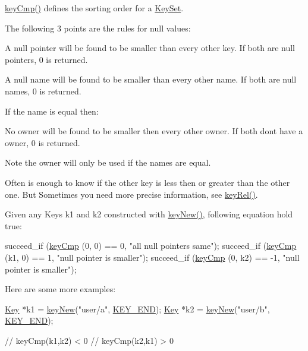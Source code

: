 \hyperlink{group__keytest_gaf6e66e12fe04d535a5d1c8218ced803e}{key\+Cmp()} defines the sorting order for a \hyperlink{classkdb_1_1KeySet}{Key\+Set}.

The following 3 points are the rules for null values\+:


\begin{DoxyItemize}
\item A null pointer will be found to be smaller than every other key. If both are null pointers, 0 is returned.
\item A null name will be found to be smaller than every other name. If both are null names, 0 is returned.
\end{DoxyItemize}

If the name is equal then\+:


\begin{DoxyItemize}
\item No owner will be found to be smaller then every other owner. If both don\textquotesingle{}t have a owner, 0 is returned.
\end{DoxyItemize}

\begin{DoxyNote}{Note}
the owner will only be used if the names are equal.
\end{DoxyNote}
Often is enough to know if the other key is less then or greater than the other one. But Sometimes you need more precise information, see \hyperlink{group__keytest_ga6bb0f95ac34ce9c42d61bb35a76139d0}{key\+Rel()}.

Given any Keys k1 and k2 constructed with \hyperlink{group__key_gad23c65b44bf48d773759e1f9a4d43b89}{key\+New()}, following equation hold true\+:


\begin{DoxyCodeInclude}
        succeed\_if (\hyperlink{group__keytest_gaf6e66e12fe04d535a5d1c8218ced803e}{keyCmp} (0, 0) == 0, \textcolor{stringliteral}{"all null pointers same"});
        succeed\_if (\hyperlink{group__keytest_gaf6e66e12fe04d535a5d1c8218ced803e}{keyCmp} (k1, 0) == 1, \textcolor{stringliteral}{"null pointer is smaller"});
        succeed\_if (\hyperlink{group__keytest_gaf6e66e12fe04d535a5d1c8218ced803e}{keyCmp} (0, k2) == -1, \textcolor{stringliteral}{"null pointer is smaller"});
\end{DoxyCodeInclude}
 Here are some more examples\+: 
\begin{DoxyCode}
\hyperlink{classkdb_1_1Key_a5679f5cae63caddd64a60388b9cc77fa}{Key} *k1 = \hyperlink{group__key_gad23c65b44bf48d773759e1f9a4d43b89}{keyNew}(\textcolor{stringliteral}{"user/a"}, \hyperlink{group__key_gga91fb3178848bd682000958089abbaf40aa8adb6fcb92dec58fb19410eacfdd403}{KEY\_END});
\hyperlink{classkdb_1_1Key_a5679f5cae63caddd64a60388b9cc77fa}{Key} *k2 = \hyperlink{group__key_gad23c65b44bf48d773759e1f9a4d43b89}{keyNew}(\textcolor{stringliteral}{"user/b"}, \hyperlink{group__key_gga91fb3178848bd682000958089abbaf40aa8adb6fcb92dec58fb19410eacfdd403}{KEY\_END});

\textcolor{comment}{// keyCmp(k1,k2) < 0}
\textcolor{comment}{// keyCmp(k2,k1) > 0}
\end{DoxyCode}


